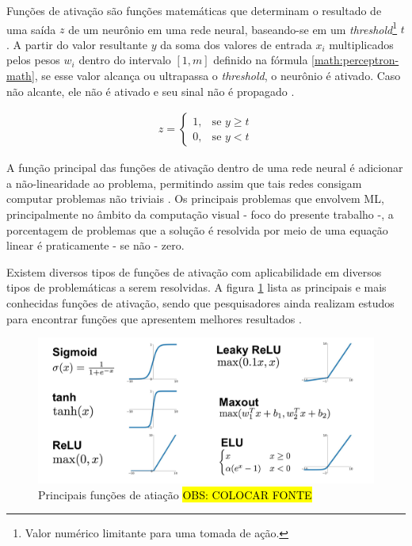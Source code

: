 Funções de ativação são funções matemáticas que determinam o resultado de uma saída \textbf{\(z\)} de um neurônio em uma rede neural, baseando-se em um \textit{threshold}\footnote{
  Valor numérico limitante para uma tomada de ação.
} \textbf{\(t\)}.
A partir do valor resultante \textbf{\(y\)} da soma dos valores de entrada \(x_i\) multiplicados pelos pesos \(w_i\) dentro do intervalo \([1, m]\) definido na fórmula \ref{math:perceptron-math}, se esse valor alcança ou ultrapassa o \textit{threshold}, o neurônio é ativado. Caso não alcante, ele não é ativado e seu sinal não é propagado \cite{python-ml}.

\begin{gather}
  z =
  \begin{cases}
    1, & \text{se } y\geq \textit{t} \\
    0, & \text{se } y < \textit{t}
  \end{cases}
  \label{math:threshold}
\end{gather}

A função principal das funções de ativação dentro de uma rede neural é adicionar a não-linearidade ao problema, permitindo assim que tais redes consigam computar problemas não triviais \cite{gentle-intro-to-nn}. Os principais problemas que envolvem ML, principalmente no âmbito da computação visual - foco do presente trabalho -, a porcentagem de problemas que a solução é resolvida por meio de uma equação linear é praticamente - se não - zero.

Existem diversos tipos de funções de ativação com aplicabilidade em diversos tipos de problemáticas a serem resolvidas. A figura \ref{fig:activation-functions} lista as principais e mais conhecidas funções de ativação, sendo que pesquisadores ainda realizam estudos para encontrar funções que apresentem melhores resultados \cite{intro-to-act-func}.


\begin{figure}[H]
  \includegraphics[width=12cm, center]{figuras/activation-functions}
  \caption{Principais funções de atiação \hl{OBS: COLOCAR FONTE}}
  \label{fig:activation-functions}
\end{figure}

